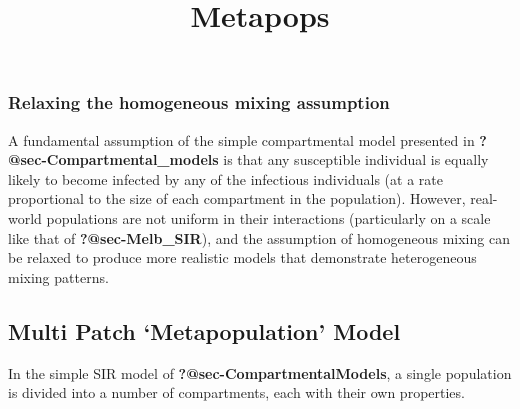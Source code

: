 \documentclass[
  letterpaper,
  DIV=11,
  numbers=noendperiod]{scrartcl}
\title{Metapops}
\author{}
\date{}
\begin{document}
\maketitle

\newcommand{\Desc}[2]{\State \makebox[2em][l]{#1}#2}
\renewcommand{\Return}{\State \textbf{return}~}
\newcommand{\Print}{\State \textbf{print}~}
\newcommand{\Break}{\State \textbf{break}}
\newcommand{\Continue}{\State \textbf{continue}}
\newcommand{\True}{\textbf{true}}
\newcommand{\False}{\textbf{false}}
\renewcommand{\And}{\textbf{and}~}
\newcommand{\Or}{\textbf{or}~}
\renewcommand{\Not}{\textbf{not}~}
\newcommand{\To}{\textbf{to}~}
\newcommand{\DownTo}{\textbf{downto}~}

\ifdefined\Shaded\renewenvironment{Shaded}{\begin{tcolorbox}[boxrule=0pt, enhanced, interior hidden, breakable, sharp corners, borderline west={3pt}{0pt}{shadecolor}, frame hidden]}{\end{tcolorbox}}\fi


\hypertarget{relaxing-the-homogeneous-mixing-assumption}{%
\subsubsection{Relaxing the homogeneous mixing
assumption}\label{relaxing-the-homogeneous-mixing-assumption}}

A fundamental assumption of the simple compartmental model presented in
\textbf{?@sec-Compartmental\_models} is that any susceptible individual
is equally likely to become infected by any of the infectious
individuals (at a rate proportional to the size of each compartment in
the population). However, real-world populations are not uniform in
their interactions (particularly on a scale like that of
\textbf{?@sec-Melb\_SIR}), and the assumption of homogeneous mixing can
be relaxed to produce more realistic models that demonstrate
heterogeneous mixing patterns.

\hypertarget{multi-patch-metapopulation-model}{%
\subsection{Multi Patch `Metapopulation'
Model}\label{multi-patch-metapopulation-model}}

In the simple SIR model of \textbf{?@sec-CompartmentalModels}, a single
population is divided into a number of compartments, each with their own
properties.
\end{document}
